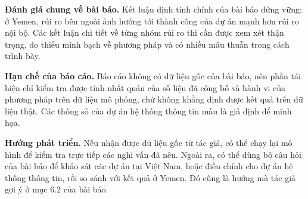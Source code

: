 \textbf{Đánh giá chung về bài báo.} Kết luận định tính chính của bài báo đứng vững: ở Yemen, rủi ro bên ngoài ảnh hưởng tới thành công của dự án mạnh hơn rủi ro nội bộ. Các kết luận chi tiết về từng nhóm rủi ro thì cần được xem xét thận trọng, do thiếu minh bạch về phương pháp và có nhiều mâu thuẫn trong cách trình bày.

\textbf{Hạn chế của báo cáo.} Báo cáo không có dữ liệu gốc của bài báo, nên phần tái hiện chỉ kiểm tra được tính nhất quán của số liệu đã công bố và hành vi của phương pháp trên dữ liệu mô phỏng, chứ không khẳng định được kết quả trên dữ liệu thật. Các thông số của dự án hệ thống thông tin mẫu là giả định để minh họa.

\textbf{Hướng phát triển.} Nếu nhận được dữ liệu gốc từ tác giả, có thể chạy lại mô hình để kiểm tra trực tiếp các nghi vấn đã nêu. Ngoài ra, có thể dùng bộ câu hỏi của bài báo để khảo sát các dự án tại Việt Nam, hoặc điều chỉnh cho dự án hệ thống thông tin, rồi so sánh với kết quả ở Yemen. Đó cũng là hướng mà tác giả gợi ý ở mục 6.2 của bài báo.

